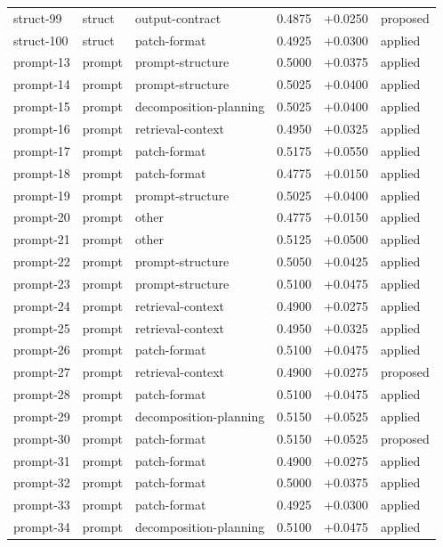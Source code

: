 \begin{center}
\begin{longtable}{llp{5.2cm}rrl}
struct-99 & struct & output-contract & 0.4875 & +0.0250 & proposed \\
struct-100 & struct & patch-format & 0.4925 & +0.0300 & applied \\
prompt-13 & prompt & prompt-structure & 0.5000 & +0.0375 & applied \\
prompt-14 & prompt & prompt-structure & 0.5025 & +0.0400 & applied \\
prompt-15 & prompt & decomposition-planning & 0.5025 & +0.0400 & applied \\
prompt-16 & prompt & retrieval-context & 0.4950 & +0.0325 & applied \\
prompt-17 & prompt & patch-format & 0.5175 & +0.0550 & applied \\
prompt-18 & prompt & patch-format & 0.4775 & +0.0150 & applied \\
prompt-19 & prompt & prompt-structure & 0.5025 & +0.0400 & applied \\
prompt-20 & prompt & other & 0.4775 & +0.0150 & applied \\
prompt-21 & prompt & other & 0.5125 & +0.0500 & applied \\
prompt-22 & prompt & prompt-structure & 0.5050 & +0.0425 & applied \\
prompt-23 & prompt & prompt-structure & 0.5100 & +0.0475 & applied \\
prompt-24 & prompt & retrieval-context & 0.4900 & +0.0275 & applied \\
prompt-25 & prompt & retrieval-context & 0.4950 & +0.0325 & applied \\
prompt-26 & prompt & patch-format & 0.5100 & +0.0475 & applied \\
prompt-27 & prompt & retrieval-context & 0.4900 & +0.0275 & proposed \\
prompt-28 & prompt & patch-format & 0.5100 & +0.0475 & applied \\
prompt-29 & prompt & decomposition-planning & 0.5150 & +0.0525 & applied \\
prompt-30 & prompt & patch-format & 0.5150 & +0.0525 & proposed \\
prompt-31 & prompt & patch-format & 0.4900 & +0.0275 & applied \\
prompt-32 & prompt & patch-format & 0.5000 & +0.0375 & applied \\
prompt-33 & prompt & patch-format & 0.4925 & +0.0300 & applied \\
prompt-34 & prompt & decomposition-planning & 0.5100 & +0.0475 & applied \\

\end{longtable}
\end{center}
